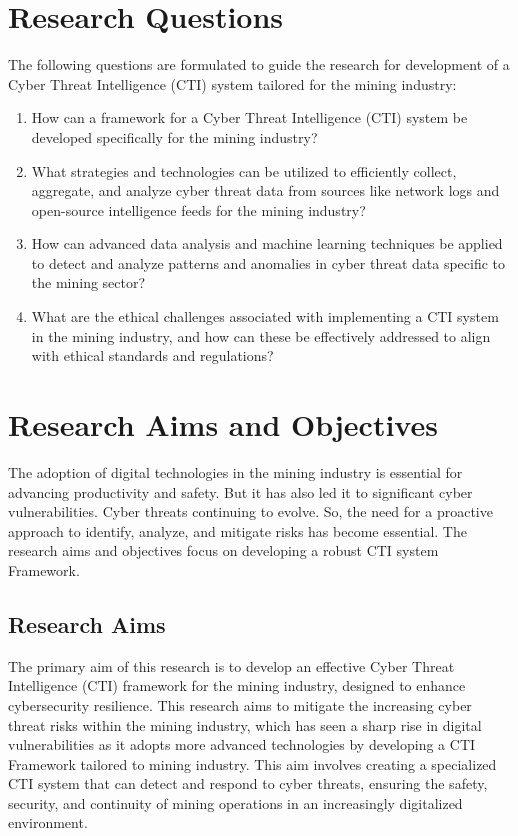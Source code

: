 \documentclass[a4paper,twoside,12pt]{report}
\begin{document}

\section{Research Questions}

The following questions are formulated to guide the research for development of a Cyber Threat Intelligence (CTI) system tailored for the mining industry:

\begin{enumerate}
    \item {How can a framework for a Cyber Threat Intelligence (CTI) system be developed specifically for the mining industry?}
 \item {What strategies and technologies can be utilized to efficiently collect, aggregate, and analyze cyber threat data from sources like network logs and open-source intelligence feeds for the mining industry?}

    \item {How can advanced data analysis and machine learning techniques be applied to detect and analyze patterns and anomalies in cyber threat data specific to the mining sector?}

    \item {What are the ethical challenges associated with implementing a CTI system in the mining industry, and how can these be effectively addressed to align with ethical standards and regulations?}
\end{enumerate}
\section{Research Aims and Objectives}
The adoption of digital technologies in the mining industry is essential for advancing productivity and safety. But it has also led it to significant cyber vulnerabilities. Cyber threats continuing to evolve. So, the need for a proactive approach to identify, analyze, and mitigate risks has become essential. The research aims and objectives focus on developing a robust CTI system Framework.\\
\subsection{Research Aims}
The primary aim of this research is to develop an effective Cyber Threat Intelligence (CTI) framework for the mining industry, designed to enhance cybersecurity resilience. This research aims to mitigate the increasing cyber threat risks within the mining industry, which has seen a sharp rise in digital vulnerabilities as it adopts more advanced technologies by developing a CTI Framework tailored to mining industry. This aim involves creating a specialized CTI system that can detect and respond to cyber threats, ensuring the safety, security, and continuity of mining operations in an increasingly digitalized environment.
\end{document}
